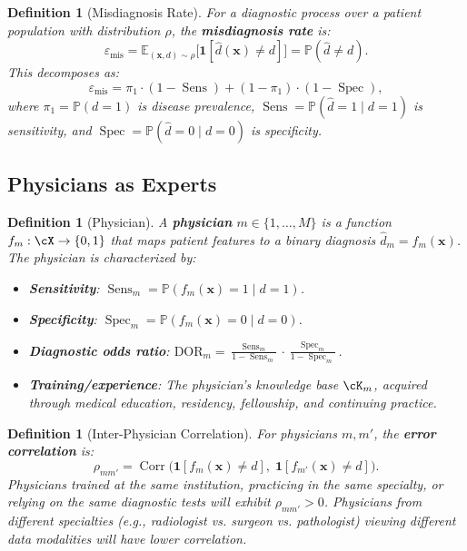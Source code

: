 \documentclass[11pt,a4paper]{article}
\newtheorem{definition}[theorem]{Definition}
\theoremstyle{definition}
\DeclareMathOperator{\Corr}{Corr}
\DeclareMathOperator{\Sens}{Sens}
\DeclareMathOperator{\Spec}{Spec}
\newcommand{\E}{\mathbb{E}}
\newcommand{\Pbb}{\mathbb{P}}
\newcommand{\ind}[1]{\mathbf{1}[#1]}
\newcommand{\disease}{d}                       %
\newcommand{\diagnosis}{\hat{d}}               %
\newcommand{\misdiagnosis}{\varepsilon_{\text{mis}}}  %
\begin{document}
\begin{definition}[Misdiagnosis Rate]
\label{def:misdiagnosis}
For a diagnostic process over a patient population with distribution $\rho$,
the \textbf{misdiagnosis rate} is:
\begin{equation}\label{eq:misdiagnosis}
    \misdiagnosis = \E_{(\mathbf{x},\disease) \sim \rho}\bigl[\ind{\diagnosis(\mathbf{x}) \neq \disease}\bigr] = \Pbb(\diagnosis \neq \disease).
\end{equation}
This decomposes as:
\begin{equation}\label{eq:misdiagnosis_decomp}
    \misdiagnosis = \pi_1 \cdot (1 - \Sens) + (1 - \pi_1) \cdot (1 - \Spec),
\end{equation}
where $\pi_1 = \Pbb(\disease = 1)$ is disease prevalence, $\Sens = \Pbb(\diagnosis=1 \mid \disease=1)$
is sensitivity, and $\Spec = \Pbb(\diagnosis=0 \mid \disease=0)$ is specificity.
\end{definition}

\subsection{Physicians as Experts}

\begin{definition}[Physician]
\label{def:physician}
A \textbf{physician} $m \in \{1, \dots, M\}$ is a function $f_m: \cX \to \{0,1\}$
that maps patient features to a binary diagnosis $\diagnosis_m = f_m(\mathbf{x})$.
The physician is characterized by:
\begin{itemize}[nosep]
    \item \textbf{Sensitivity}: $\Sens_m = \Pbb(f_m(\mathbf{x}) = 1 \mid \disease = 1)$.
    \item \textbf{Specificity}: $\Spec_m = \Pbb(f_m(\mathbf{x}) = 0 \mid \disease = 0)$.
    \item \textbf{Diagnostic odds ratio}: $\text{DOR}_m = \frac{\Sens_m}{1 - \Sens_m} \cdot \frac{\Spec_m}{1 - \Spec_m}$.
    \item \textbf{Training/experience}: The physician's knowledge base $\cK_m$, acquired through
    medical education, residency, fellowship, and continuing practice.
\end{itemize}
\end{definition}

\begin{definition}[Inter-Physician Correlation]
\label{def:physician_corr}
For physicians $m, m'$, the \textbf{error correlation} is:
\begin{equation}\label{eq:phys_corr}
    \rho_{mm'} = \Corr\bigl(\ind{f_m(\mathbf{x}) \neq \disease},\; \ind{f_{m'}(\mathbf{x}) \neq \disease}\bigr).
\end{equation}
Physicians trained at the same institution, practicing in the same specialty,
or relying on the same diagnostic tests will exhibit $\rho_{mm'} > 0$.
Physicians from different specialties (e.g., radiologist vs. surgeon vs. pathologist)
viewing different data modalities will have lower correlation.
\end{definition}
\end{document}
